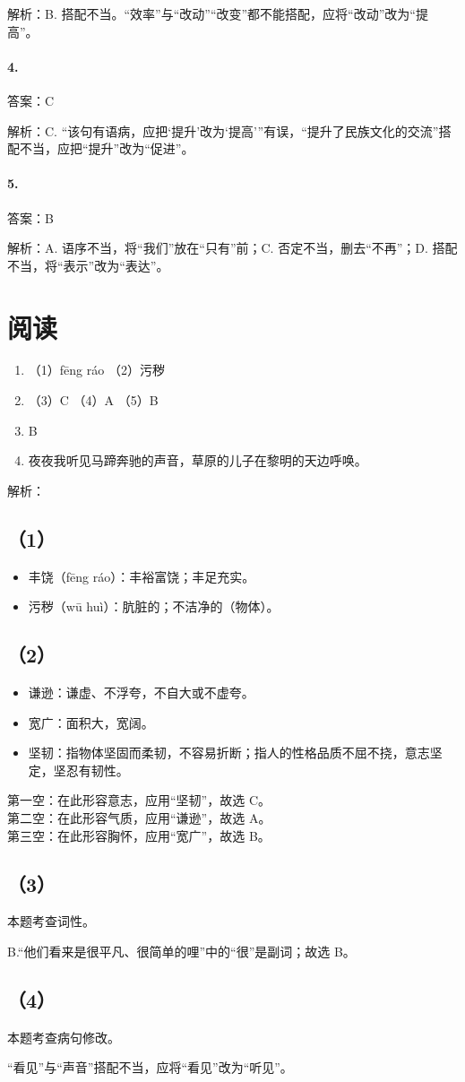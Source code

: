 解析：B. 搭配不当。“效率”与“改动”“改变”都不能搭配，应将“改动”改为“提高”。

\paragraph{4.} 答案：C

解析：C. “该句有语病，应把‘提升’改为‘提高’”有误，“提升了民族文化的交流”搭配不当，应把“提升”改为“促进”。

\paragraph{5.} 答案：B

解析：A. 语序不当，将“我们”放在“只有”前；C. 否定不当，删去“不再”；D. 搭配不当，将“表示”改为“表达”。


\section{阅读}

\begin{enumerate}[leftmargin=*]
    \item （1）fēng ráo \quad （2）污秽
    \item （3）C \quad （4）A \quad （5）B
    \item B
    \item 夜夜我听见马蹄奔驰的声音，草原的儿子在黎明的天边呼唤。
\end{enumerate}

解析：

\subsection*{（1）}
\begin{itemize}[leftmargin=*]
    \item 丰饶（fēng ráo）：丰裕富饶；丰足充实。
    \item 污秽（wū huì）：肮脏的；不洁净的（物体）。
\end{itemize}

\subsection*{（2）}
\begin{itemize}[leftmargin=*]
    \item 谦逊：谦虚、不浮夸，不自大或不虚夸。
    \item 宽广：面积大，宽阔。
    \item 坚韧：指物体坚固而柔韧，不容易折断；指人的性格品质不屈不挠，意志坚定，坚忍有韧性。
\end{itemize}

第一空：在此形容意志，应用“坚韧”，故选 C。\\
第二空：在此形容气质，应用“谦逊”，故选 A。\\
第三空：在此形容胸怀，应用“宽广”，故选 B。

\subsection*{（3）}
本题考查词性。

B.“他们看来是很平凡、很简单的哩”中的“很”是副词；故选 B。

\subsection*{（4）}
本题考查病句修改。

“看见”与“声音”搭配不当，应将“看见”改为“听见”。